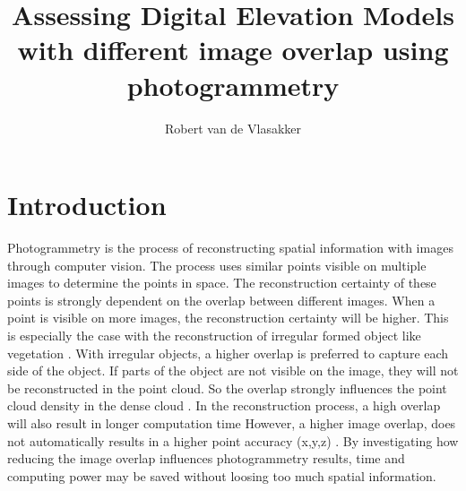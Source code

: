 \documentclass{isprs} %
\begin{document}
\title{Assessing Digital Elevation Models with different image overlap using photogrammetry}

\author{Robert van de Vlasakker}

\address{} %


\commission{}{} %
\workinggroup{} %
\icwg{}   %



\maketitle


\section{Introduction}\label{Introduction}


Photogrammetry is the process of reconstructing spatial information with images through computer vision. 
The process uses similar points visible on multiple images to determine the points in space.
The reconstruction certainty of these points is strongly dependent on the overlap between different images. 
When a point is visible on more images, the reconstruction certainty will be higher.
This is especially the case with the reconstruction of irregular formed object like vegetation \citep{AccessingImageOverlap}.
With irregular objects, a higher overlap is preferred to capture each side of the object.
If parts of the object are not visible on the image, they will not be reconstructed in the point cloud.
So the overlap strongly influences the point cloud density in the dense cloud \citep{OptimalAltOverWeath}.
In the reconstruction process, a high overlap will also result in longer computation time \citep{AccessingImageOverlap}
However, a higher image overlap, does not automatically results in a higher point accuracy (x,y,z) \citep{EffectofUABimgcamover}.
By investigating how reducing the image overlap influences photogrammetry results, time and computing power may be saved without loosing too much spatial information.
\end{document}
